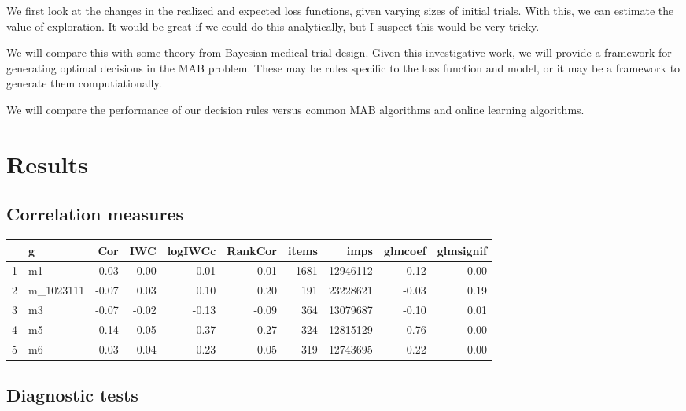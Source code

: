 \documentclass[12pt]{article}
\begin{document}
We first look at the changes in the realized and expected loss functions, given varying sizes of initial trials. With this, we can estimate the value of exploration. It would be great if we could do this analytically, but I suspect this would be very tricky. 

We will compare this with some theory from Bayesian medical trial design. Given this investigative work, we will provide a framework for generating optimal decisions in the MAB problem. These may be rules specific to the loss function and model, or it may be a framework to generate them computiationally.

We will compare the performance of our decision rules versus common MAB algorithms and online learning algorithms.

\section{Results}

\subsection{Correlation measures}

\begin{table}[ht]
\centering
\begin{tabular}{rlrrrrrrrr}
  \hline
 & g & Cor & IWC & logIWCc & RankCor & items & imps & glmcoef & glmsignif \\ 
  \hline
1 & m1 & -0.03 & -0.00 & -0.01 & 0.01 & 1681 & 12946112 & 0.12 & 0.00 \\ 
  2 & m\_1023111 & -0.07 & 0.03 & 0.10 & 0.20 & 191 & 23228621 & -0.03 & 0.19 \\ 
  3 & m3 & -0.07 & -0.02 & -0.13 & -0.09 & 364 & 13079687 & -0.10 & 0.01 \\ 
  4 & m5 & 0.14 & 0.05 & 0.37 & 0.27 & 324 & 12815129 & 0.76 & 0.00 \\ 
  5 & m6 & 0.03 & 0.04 & 0.23 & 0.05 & 319 & 12743695 & 0.22 & 0.00 \\ 
   \hline
\end{tabular}
\end{table}


\subsection{Diagnostic tests}
\end{document}
